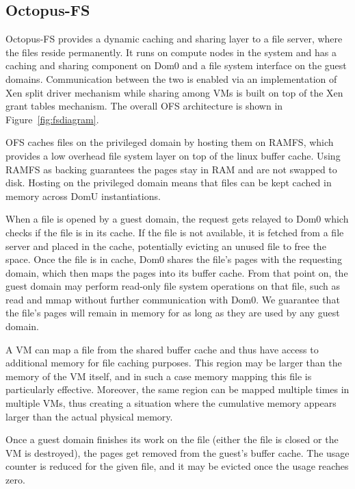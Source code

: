 
\subsection{Octopus-FS}\label{sec:VSFS_Impl}

Octopus-FS provides a dynamic caching and sharing layer to a file
server, where the files reside permanently. It runs on compute nodes
in the system and has a caching and sharing component on Dom0 and a
file system interface on the guest domains. Communication between the
two is enabled via an implementation of Xen split driver mechanism
while sharing among VMs is built on top of the Xen grant tables
mechanism. The overall OFS architecture is shown in
Figure~\ref{fig:fsdiagram}.

OFS caches files on the privileged domain by hosting them on RAMFS,
which provides a low overhead file system layer on top of the linux
buffer cache. Using RAMFS as backing guarantees the pages stay in RAM
and are not swapped to disk. Hosting on the privileged domain means
that files can be kept cached in memory across DomU instantiations.

When a file is opened by a guest domain, the request gets relayed to Dom0 which checks if the file is in its cache. If the file is not available, it is fetched from a file server and placed in the cache, potentially evicting an unused file to free the space. Once the file is in cache, Dom0 shares the file's pages with the requesting domain, which then maps the pages into its buffer cache. From that point on, the guest domain may perform read-only file system operations on that file, such as read and mmap without further communication with Dom0. We guarantee that the file's pages will remain in memory for as long as they are used by any guest domain. 

A VM can map a file from the shared buffer cache and thus have access to additional memory for file caching purposes. This region may be larger than the memory of the VM itself, and in such a case memory mapping this file is particularly effective. Moreover, the same region can be mapped multiple times in multiple VMs, thus creating a situation where the cumulative memory appears larger than the actual physical memory.

Once a guest domain finishes its work on the file (either the file is closed or the VM is destroyed), the pages get removed from the guest's buffer cache. The usage counter is reduced for the given file, and it may be evicted once the usage reaches zero.

